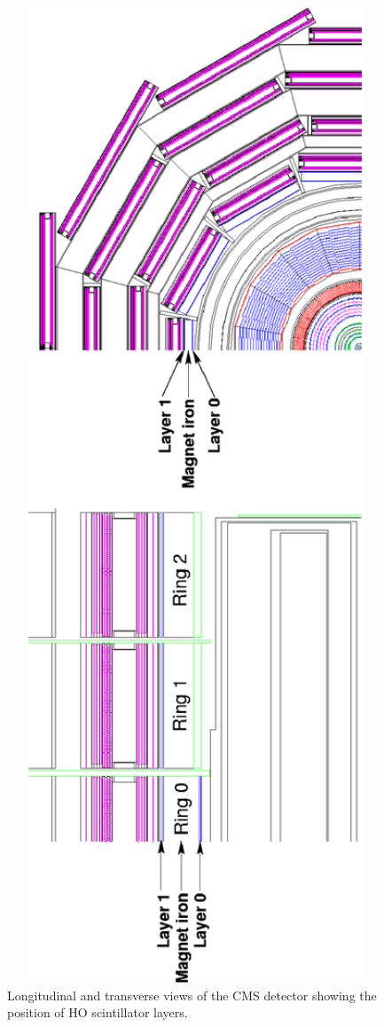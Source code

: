 \documentclass{cmspaper}
\begin{document}
\begin{figure}[b]
 \centering
 \includegraphics[angle=-90,width=6in]{figs/HO_layers}
 \caption{Longitudinal and transverse views of the CMS detector showing the position of HO scintillator layers.}
 \label{fig:HO_layers}
\end{figure}
\end{document}
